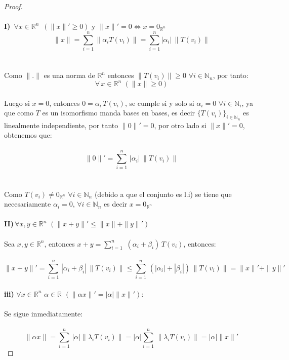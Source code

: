 \documentclass[11pt,letterpaper]{article}
\newcommand{\R}{\mathbb{R}}
\newcommand{\N}{\mathbb{N}}
\begin{document}
\begin{proof}\,\\
    \,\\
    \textbf{I)}\,\,\,$\forall x \in \R^n$\,\,\,$(\|x\|'\geq 0)$ y $\|x\|'=0\iff x=0_{\R^n}$
    \,\\
    \begin{equation*}
        \|x\|=\sum_{i=1}^n \|\alpha_i T(v_i)\|=\sum_{i=1}^n |\alpha_i|\,\|T(v_i)\|
    \end{equation*}\,\\
    \,\\
    Como $\parallel . \parallel$ es una norma de $\R^n$ entonces $\|T(v_i)\|\geq 0$ $\forall i\in \N_n$, por tanto:\,\\
    \begin{equation*}
        \forall\,x\in \R^n\,\,(\|x\|\geq 0)
    \end{equation*}\,\\
    Luego si $x=0$, entonces $0=\alpha_i\,T(v_i)$, se cumple si y solo si $\alpha_i=0$ $\forall i\in \N_i$, ya que como $T$ es un isomorfismo manda bases en bases, es decir $\{T(v_i)\}_{i\in \N_n}$
    es linealmente independiente, por tanto $\|0\|'=0$, por otro lado si $\|x\|'=0$, obtenemos que:\,\\
    \,\\
    \begin{equation*}
        \|0\|'=\sum_{i=1}^n\,|\alpha_i|\,\|T(v_i)\|
    \end{equation*}\,\\
    \,\\
    Como $T(v_i)\neq 0_{\R^n}$ $\forall i\in \N_n$ (debido a que el conjunto es l.i) se tiene que necesariamente $\alpha_i=0$, $\forall i\in \N_n$ es decir $x=0_{\R^n}$\,\\
    \,\\ 
    \textbf{II)}\,$\forall x,y \in \R^n$\,\,$(\|x+y\|'\leq \|x\| +\|y\|')$\,\\
    \,\\
    Sea $x,y\in \R^n$, entonces $x+y=\displaystyle\sum_{i=1}^{n}\,\,(\alpha_i+\beta_i)\,T(v_i)$, entonces:\,\\
    \,\\
    \begin{equation*}
        \|x+y\|'=\sum_{i=1}^{n}\,|\alpha_i+\beta_i|\,\|T(v_i)\|\leq \sum_{i=1}^{n}\,(|\alpha_i|+|\beta_i|)\,\|T(v_i)\|= \|x\|' +\|y\|'
    \end{equation*}\,\\
    \textbf{iii)}\,\,$\forall x\in \R^n\,\,\alpha \in \R$  $(\|\alpha x\|'=|\alpha|\|x\|')$:\,\\
    \,\\
    Se sigue inmediatamente:\,\\
    \,\\
    \begin{equation*}
        \|\alpha x\|=\sum_{i=1}^{n}\,|\alpha| \|\lambda_i T(v_i)\|=|\alpha| \sum_{i=1}^{n}\,\|\lambda_i T(v_i)\|=|\alpha|\|x\|'
    \end{equation*}
\end{proof}\,\\
\end{document}
